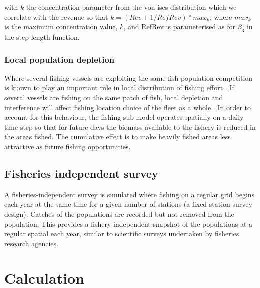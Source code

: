 \documentclass[review]{elsarticle}
\begin{document}
with $k$ the concentration parameter from the von ises
distribution which we correlate with the revenue so that $k = (Rev + 1 /
RefRev) * max_{k}$, where $max_{k}$ is the maximum concentration value, $k$,
and RefRev is parameterised as for $\beta_{3}$ in the step length function. 

\subsubsection{Local population depletion}

Where several fishing vessels are exploiting the same fish population
competition is known to play an important role in local distribution of fishing
effort \citep{Gillis1998}. If several vessels are fishing on the same patch of
fish, local depletion and interference  will affect
fishing location choice of the fleet as a whole \citep{Rijnsdorp2000,
	Poos2007a}. In order to account for this behaviour, the fishing
sub-model operates spatially on a daily time-step so that for future days the
biomass available to the fishery is reduced in the areas fished. The cumulative
effect is to make heavily fished areas less attractive as future fishing
opportunities. 

\subsection{Fisheries independent survey}

A fisheries-independent survey is simulated where fishing on a regular grid
begins each year at the same time for a given number of stations (a fixed
station survey design). Catches of the populations  are recorded but not removed from the population. This
provides a fishery independent snapshot of the populations at a regular spatial
 each year, similar to scientific
surveys undertaken by fisheries research agencies. 

\section{Calculation}

%
\end{document}
